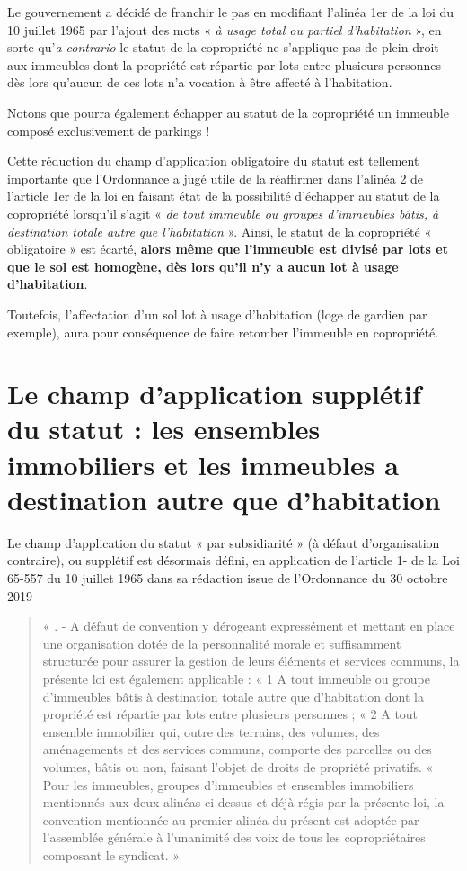 		Le gouvernement a décidé de franchir le pas en modifiant l’alinéa 1er de la loi du 10 juillet 1965 par l’ajout
		des mots « \textit{à usage total ou partiel d’habitation} », en sorte qu’\textit{a contrario }le statut de la copropriété ne s’applique pas de plein droit aux immeubles dont la propriété est répartie par lots entre plusieurs
		personnes dès lors qu’aucun de ces lots n’a vocation à être affecté à l’habitation.
		
		Notons que pourra également échapper au statut de la copropriété un immeuble composé exclusivement
		de parkings !
		
		Cette réduction du champ d’application obligatoire du statut est tellement importante que l’Ordonnance
		a jugé utile de la réaffirmer dans l’alinéa 2 de l’article 1er de la loi en faisant état de la possibilité
		d’échapper au statut de la copropriété lorsqu’il s’agit « \textit{de tout immeuble ou groupes d’immeubles bâtis, à
		destination totale autre que l’habitation} ».
		Ainsi, le statut de la copropriété « obligatoire » est écarté, \textbf{alors même que l’immeuble est divisé par lots
		et que le sol est homogène, dès lors qu’il n’y a aucun lot à usage d’habitation}.
	
		Toutefois, l’affectation d’un sol lot à usage d’habitation (loge de gardien par exemple), aura pour
		conséquence de faire retomber l’immeuble en copropriété.

\section{Le champ d’application supplétif du statut : les ensembles immobiliers et les immeubles a destination autre que d'habitation}
	Le champ d’application du statut « par subsidiarité » (à défaut d’organisation contraire), ou supplétif est
	désormais défini, en application de l’article 1-\II{} de la Loi 65-557 du 10 juillet 1965 dans sa rédaction issue
	de l’Ordonnance du 30 octobre 2019
	\begin{quote}
		« \II. - A défaut de convention y dérogeant expressément et mettant en place une organisation dotée de
		la personnalité morale et suffisamment structurée pour assurer la gestion de leurs éléments et services
		communs, la présente loi est également applicable :
		« 1\degre{} A tout immeuble ou groupe d’immeubles bâtis à destination totale autre que d’habitation dont la
		propriété est répartie par lots entre plusieurs personnes ;
		« 2\degre{} A tout ensemble immobilier qui, outre des terrains, des volumes, des aménagements et des services
		communs, comporte des parcelles ou des volumes, bâtis ou non, faisant l’objet de droits de propriété
		privatifs.
		« Pour les immeubles, groupes d’immeubles et ensembles immobiliers mentionnés aux deux alinéas ci dessus
		et déjà régis par la présente loi, la convention mentionnée au premier alinéa du présent \II{} est
		adoptée par l’assemblée générale à l’unanimité des voix de tous les copropriétaires composant le
		syndicat. »
	\end{quote}
	
